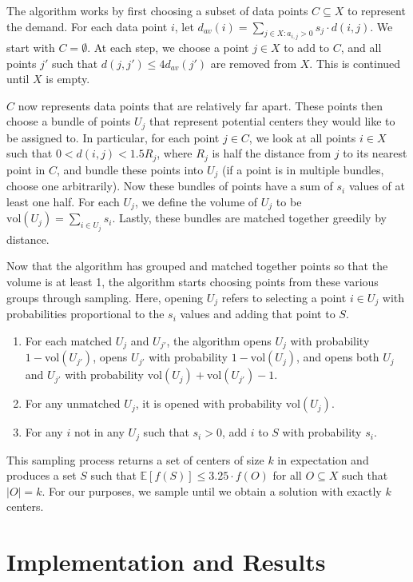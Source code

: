\documentclass[conference, 10pt, final]{IEEEtran}
\begin{document}
The algorithm works by first choosing a subset of data points $C \subseteq X$ to represent the demand. For each data point $i$, let $d_{av}(i) = \sum_{j \in X : a_{i,j} > 0} s_j \cdot d(i,j)$. We start with $C = \emptyset$. At each step, we choose a point $j \in X$ to add to $C$, and all points $j'$ such that $d(j,j') \leq 4 d_{av}(j') $ are removed from $X$. This is continued until $X$ is empty. 

$C$ now represents data points that are relatively far apart. These points then choose a bundle of points $U_j$ that represent potential centers they would like to be assigned to. In particular, for each point $j \in C$, we look at all points $i \in X$ such that $0 < d(i,j) < 1.5 R_j$, where $R_j$ is half the distance from $j$ to its nearest point in $C$, and bundle these points into $U_j$ (if a point is in multiple bundles, choose one arbitrarily). Now these bundles of points have a sum of $s_i$ values of at least one half. For each $U_j$, we define the volume of $U_j$ to be $\mathrm{vol}(U_j) = \sum_{i \in U_j} s_i$. Lastly, these bundles are matched together greedily by distance. 

Now that the algorithm has grouped and matched together points so that the volume is at least 1, the algorithm starts choosing points from these various groups through sampling. Here, opening $U_j$ refers to selecting a point $i \in U_j$ with probabilities proportional to the $s_i$ values and adding that point to $S$. 
\begin{enumerate}[\IEEEsetlabelwidth{3)}]
\item For each matched $U_j$ and $U_{j'}$, the algorithm opens $U_j$ with probability $1-\mathrm{vol}(U_{j'})$, opens $U_{j'}$ with probability $1- \mathrm{vol}(U_j)$, and opens both $U_{j}$ and $U_{j'}$ with probability $\mathrm{vol}(U_j) + \mathrm{vol}(U_{j'}) -1$. 
\item For any unmatched $U_j$, it is opened with probability $\mathrm{vol}(U_j)$.
\item For any $i$ not in any $U_j$ such that $s_i > 0$, add $i$ to $S$ with probability $s_i$. 
\end{enumerate}
This sampling process returns a set of centers of size $k$  in expectation and produces a set $S$ such that $\mathbb{E}[f(S)] \leq 3.25 \cdot f(O)$ for all $O \subseteq X$ such that $|O| = k$. For our purposes, we sample until we obtain a solution with exactly $k$ centers. 

\section{Implementation and Results}
\end{document}
